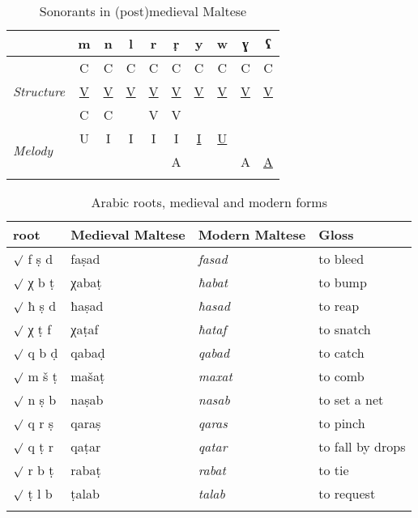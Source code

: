 \documentclass[output=paper]{langsci/langscibook}
\begin{document}
\begin{table}[t]
\begin{tabularx}{.9\textwidth}{Xccccccccc}
\lsptoprule
& \textbf{m} & \textbf{n} & \textbf{l} & \textbf{r} & \textbf{ṛ} & \textbf{y} & \textbf{w} & \textbf{ɣ} & \textbf{ʕ}\\
\midrule
\multirow{3}{*}{\textit{Structure}} & C & C & C & C & C & C & C & C & C\\
 & \underline{V} & \underline{V} & \underline{V} & \underline{V} & \underline{V} & \underline{V} & \underline{V} & \underline{V} & \underline{V}\\
 & C & C &  & V & V &  &  &  & \\
\midrule           
\multirow{2}{*}{\textit{Melody}} & U & I & I & I & I & \underline{I} & \underline{U} &  & \\
&  &  &  &  & A &  &  & A & \underline{A}\\
\lspbottomrule
\end{tabularx}
\caption{Sonorants in (post)medieval Maltese}
\label{tab:puech:2}
\end{table}

   
\begin{table}[p] 
 \caption{Arabic roots, medieval and modern forms}
 \label{extab:puech:3}
\begin{tabularx}{.9\textwidth}{Qlll}
\lsptoprule
           root & Medieval Maltese  & Modern Maltese &  Gloss\\
\midrule
  ${\surd}$ f ṣ d & faṣad &\textit{fasad} & to bleed            \\
  ${\surd}$ χ b ṭ & χabaṭ &\textit{ħabat} & to bump             \\
  ${\surd}$ ħ ṣ d & ħaṣad &\textit{ħasad} & to reap             \\
  ${\surd}$ χ ṭ f & χaṭaf &\textit{ħataf} & to snatch           \\
  ${\surd}$ q b ḍ & qabaḍ &\textit{qabad} & to catch            \\
  ${\surd}$ m š ṭ & mašaṭ &\textit{maxat} & to comb             \\
  ${\surd}$ n ṣ b & naṣab &\textit{nasab} & to set a net        \\
  ${\surd}$ q r ṣ & qaraṣ &\textit{qaras} & to pinch            \\
  ${\surd}$ q ṭ r & qaṭar &\textit{qatar} & to fall by drops    \\
  ${\surd}$ r b ṭ & rabaṭ &\textit{rabat} & to tie              \\
  ${\surd}$ ṭ l b & ṭalab &\textit{talab} & to request          \\
  \lspbottomrule
     \end{tabularx}
\end{table}
\clearpage
\end{document}
